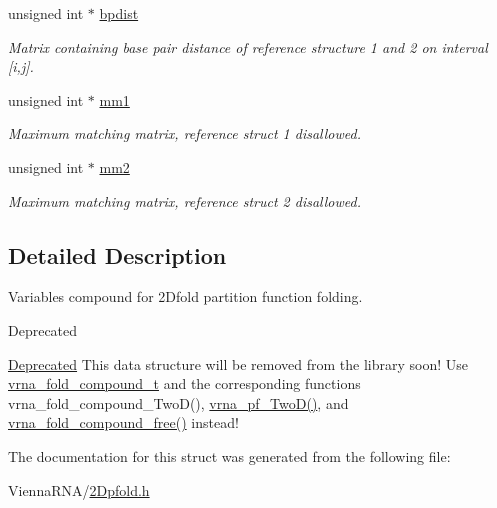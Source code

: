 \begin{DoxyCompactItemize}
\mbox{\label{structTwoDpfold__vars_accef8eaa05fa57ca33aa22cbc7b7aaff}} 
unsigned int $\ast$ \mbox{\hyperlink{structTwoDpfold__vars_accef8eaa05fa57ca33aa22cbc7b7aaff}{bpdist}}
\begin{DoxyCompactList}\small\item\em Matrix containing base pair distance of reference structure 1 and 2 on interval \mbox{[}i,j\mbox{]}. \end{DoxyCompactList}\item 
\mbox{\label{structTwoDpfold__vars_a7c9e9af6224d4696118e05835441863d}} 
unsigned int $\ast$ \mbox{\hyperlink{structTwoDpfold__vars_a7c9e9af6224d4696118e05835441863d}{mm1}}
\begin{DoxyCompactList}\small\item\em Maximum matching matrix, reference struct 1 disallowed. \end{DoxyCompactList}\item 
\mbox{\label{structTwoDpfold__vars_affb913470783f9edb12a0bfc22466269}} 
unsigned int $\ast$ \mbox{\hyperlink{structTwoDpfold__vars_affb913470783f9edb12a0bfc22466269}{mm2}}
\begin{DoxyCompactList}\small\item\em Maximum matching matrix, reference struct 2 disallowed. \end{DoxyCompactList}\end{DoxyCompactItemize}


\subsection{Detailed Description}
Variables compound for 2Dfold partition function folding. 

\begin{DoxyRefDesc}{Deprecated}
\item[\mbox{\hyperlink{deprecated__deprecated000006}{Deprecated}}]This data structure will be removed from the library soon! Use \mbox{\hyperlink{group__fold__compound_ga1b0cef17fd40466cef5968eaeeff6166}{vrna\+\_\+fold\+\_\+compound\+\_\+t}} and the corresponding functions vrna\+\_\+fold\+\_\+compound\+\_\+\+Two\+D(), \mbox{\hyperlink{group__kl__neighborhood__pf_ga0bc3427689bd09da09b8b3094a27f836}{vrna\+\_\+pf\+\_\+\+Two\+D()}}, and \mbox{\hyperlink{group__fold__compound_ga576a077b418a9c3650e06f8e5d296fc2}{vrna\+\_\+fold\+\_\+compound\+\_\+free()}} instead! \end{DoxyRefDesc}


The documentation for this struct was generated from the following file\+:\begin{DoxyCompactItemize}
\item 
Vienna\+R\+N\+A/\mbox{\hyperlink{2Dpfold_8h}{2\+Dpfold.\+h}}\end{DoxyCompactItemize}
